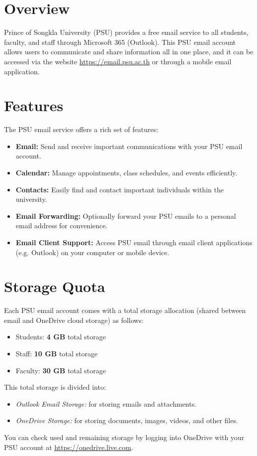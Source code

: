 \documentclass{article}
\begin{document}
\section{Overview}
Prince of Songkla University (PSU) provides a free email service to all students, faculty, and staff through Microsoft 365 (Outlook). This PSU email account allows users to communicate and share information all in one place, and it can be accessed via the website \url{https://email.psu.ac.th} or through a mobile email application.

\section{Features}
The PSU email service offers a rich set of features:
\begin{itemize}
    \item \textbf{Email:} Send and receive important communications with your PSU email account.
    \item \textbf{Calendar:} Manage appointments, class schedules, and events efficiently.
    \item \textbf{Contacts:} Easily find and contact important individuals within the university.
    \item \textbf{Email Forwarding:} Optionally forward your PSU emails to a personal email address for convenience.
    \item \textbf{Email Client Support:} Access PSU email through email client applications (e.g. Outlook) on your computer or mobile device.
\end{itemize}

\section{Storage Quota}
Each PSU email account comes with a total storage allocation (shared between email and OneDrive cloud storage) as follows:
\begin{itemize}
    \item Students: \textbf{4 GB} total storage
    \item Staff: \textbf{10 GB} total storage
    \item Faculty: \textbf{30 GB} total storage
\end{itemize}
This total storage is divided into:
\begin{itemize}
    \item \textit{Outlook Email Storage:} for storing emails and attachments.
    \item \textit{OneDrive Storage:} for storing documents, images, videos, and other files.
\end{itemize}
You can check used and remaining storage by logging into OneDrive with your PSU account at \url{https://onedrive.live.com}.
\end{document}
